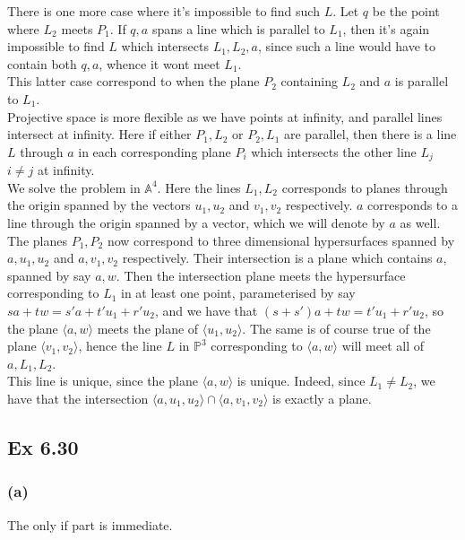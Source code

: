 \documentclass{article}
\theoremstyle{definition}
\renewcommand{\P}{\mathbb{P}}
\newcommand{\A}{\mathbb{A}}
\renewcommand{\AA}[1]{\A^{#1}}
\newcommand{\PP}[1]{\P^{#1}}
\begin{document}
There is one more case where it's impossible to find such $L$. Let $q$ be the
point where $L_2$ meets $P_1$. If $q, a$ spans a line which is parallel to $L_1$,
then it's again impossible to find $L$ which intersects $L_1, L_2, a$, since such
a line would have to contain both $q, a$, whence it wont meet $L_1$. \\

This latter case correspond to when the plane $P_2$ containing $L_2$ and 
$a$ is parallel to $L_1$. \\

Projective space is more flexible as we have points at infinity, and parallel
lines intersect at infinity. Here if either $P_1, L_2$ or $P_2, L_1$ are
parallel, then there is a line $L$ through $a$ in each corresponding plane
$P_i$ which intersects the other line $L_j$ $i \not = j$ at infinity. \\

We solve the problem in $\AA{4}$. Here the lines $L_1, L_2$ corresponds to
planes through the origin spanned by the vectors $u_1, u_2$ and $v_1, v_2$
respectively. $a$ corresponds to a line through the origin spanned by a vector,
which we will denote by $a$ as well. The planes $P_1, P_2$ now correspond to
three dimensional hypersurfaces spanned by $a, u_1, u_2$ and $a, v_1, v_2$
respectively. Their intersection is a plane which contains $a$, spanned by say
$a, w$. Then the intersection plane meets the hypersurface corresponding to
$L_1$ in at least one point, parameterised by say $sa + tw = s'a + t'u_1 + r'
u_2$, and we have that $(s + s')a + tw = t'u_1 + r' u_2$, so the plane $\langle
a, w \rangle$ meets the plane of $\langle u_1, u_2 \rangle $. The same is of
course true of the plane $\langle v_1, v_2 \rangle $, hence the line $L$ in
$\PP{3}$ corresponding to $\langle a, w \rangle $ will meet all of $a, L_1,
L_2$. \\

This line is unique, since the plane $\langle a, w \rangle$ is unique. Indeed,
since $L_1 \not = L_2$, we have that the intersection $\langle a, u_1, u_2
\rangle \cap \langle a, v_1, v_2 \rangle$ is exactly a plane.

\subsection*{Ex 6.30}

\subsubsection*{(a)}
The only if part is immediate. \\
\end{document}
